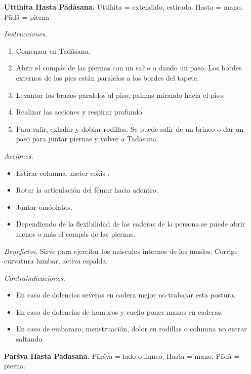 \medskip\noindent\textbf{Uttihita Hasta
Pādāsana.}
Uttihita = extendido, estirado. Hasta = mano.
Pādā = pierna

\emph{Instrucciones.}
\begin{enumerate}
\item Comenzar en Tadāsana.
\item Abrir el compás de las piernas con un
salto o dando un paso. Los bordes externos de
los pies están paralelos a los bordes del
tapete.
\item Levantar los brazos paralelos al piso,
palmas mirando hacia el piso.
\item Realizar las acciones y respirar
profundo.
\item Para salir, exhalar y doblar rodillas.
Se puede salir de un brinco o dar un paso
para juntar piernas y volver a Tadāsana.
\end{enumerate}

\emph{Acciones.}
\begin{itemize}
\item Estirar columna, meter coxis .
\item Rotar la articulación del fémur hacia
adentro.
\item Juntar omóplatos.
\item Dependiendo de la flexibilidad de las
caderas de la persona se puede abrir menos o
más el compás de las piernas.
\end{itemize}

\emph{Beneficios.} Sirve para ejercitar los
músculos internos de los muslos. Corrige
curvatura lumbar, activa espalda.

\emph{Contraindicaciones.}
\begin{itemize}
\item En caso de dolencias severas en cadera
mejor no trabajar esta postura.
\item En caso de dolencias de hombros y
cuello poner manos en caderas.
\item En caso de embarazo, menstruación,
dolor en rodillas o columna no entrar
saltando.
\end{itemize}

\medskip\noindent\textbf{Pārśva Hasta
Pādāsana.}
Pārśva = lado o flanco. Hasta = mano. Pādā =
pierna.

